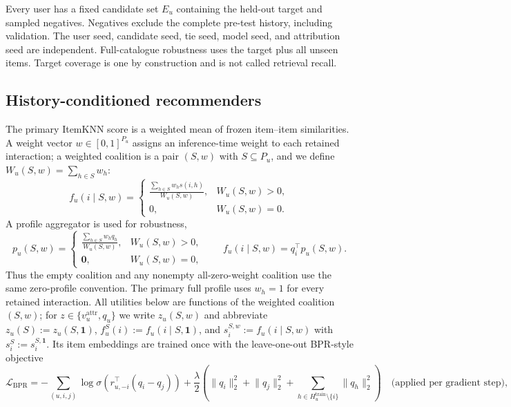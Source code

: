 \documentclass[a4paper,fleqn,doubleblind]{cas-sc}
\begin{document}
Every user has a fixed candidate set $E_u$ containing the held-out target and sampled negatives. Negatives exclude the complete pre-test history, including validation. The user seed, candidate seed, tie seed, model seed, and attribution seed are independent. Full-catalogue robustness uses the target plus all unseen items. Target coverage is one by construction and is not called retrieval recall.

\subsection{History-conditioned recommenders}
The primary ItemKNN score is a weighted mean of frozen item--item similarities. A weight vector $w\in[0,1]^{P_u}$ assigns an inference-time weight to each retained interaction; a weighted coalition is a pair $(S,w)$ with $S\subseteq P_u$, and we define $W_u(S,w)=\sum_{h\in S}w_h$:
\begin{equation}
f_u(i\mid S,w)=
\begin{cases}
\displaystyle\frac{\sum_{h\in S}w_hs(i,h)}{W_u(S,w)},&W_u(S,w)>0,\\[6pt]
0,&W_u(S,w)=0.
\end{cases}
\label{eq:itemknn-weighted}
\end{equation}
A profile aggregator is used for robustness,
\begin{equation}
p_u(S,w)=
\begin{cases}
\displaystyle\frac{\sum_{h\in S}w_hq_h}{W_u(S,w)},&W_u(S,w)>0,\\[6pt]
\mathbf 0,&W_u(S,w)=0,
\end{cases}
\qquad f_u(i\mid S,w)=q_i^\top p_u(S,w).
\label{eq:profile-weighted}
\end{equation}
Thus the empty coalition and any nonempty all-zero-weight coalition use the same zero-profile convention. The primary full profile uses $w_h=1$ for every retained interaction. All utilities below are functions of the weighted coalition $(S,w)$; for $z\in\{v_u^{\mathrm{attr}},q_u\}$ we write $z_u(S,w)$ and abbreviate $z_u(S):=z_u(S,\mathbf{1})$, $f_u^S(i):=f_u(i\mid S,\mathbf{1})$, and $s_i^{S,w}:=f_u(i\mid S,w)$ with $s_i^S:=s_i^{S,\mathbf{1}}$.
Its item embeddings are trained once with the leave-one-out BPR-style objective
\begin{equation}
\mathcal{L}_{\mathrm{BPR}}=-\sum_{(u,i,j)}\log\sigma\left(r_{u,-i}^{\top}(q_i-q_j)\right)
+\frac{\lambda}{2}\left(\lVert q_i\rVert_2^2+\lVert q_j\rVert_2^2+\sum_{h\in H_u^{\mathrm{train}}\setminus\{i\}}\lVert q_h\rVert_2^2\right)\quad\text{(applied per gradient step)},
\label{eq:bpr}
\end{equation}
\end{document}
